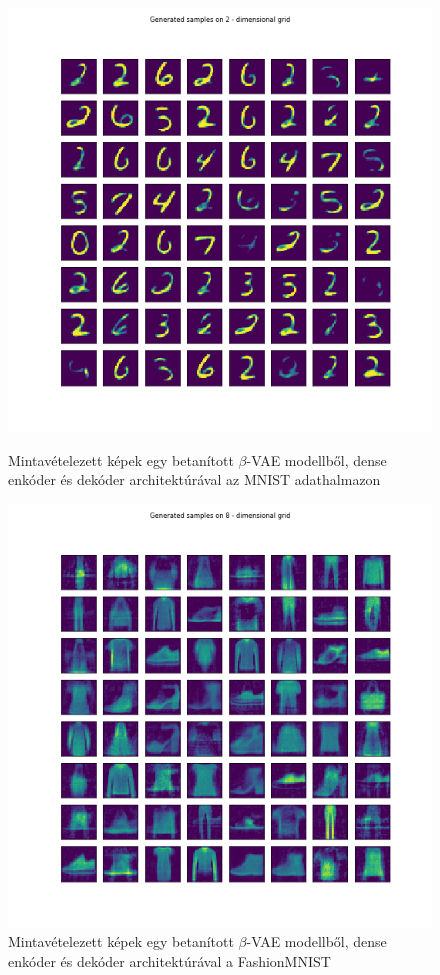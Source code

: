 \documentclass[12pt, english]{article}
\begin{document}
\begin{figure}[ht] 
  \begin{minipage}{0.48\linewidth}
    \centering
    \includegraphics[width=.65\linewidth]{gen/generated_samples_mnist_dense_vae.png}
    \caption{Mintavételezett képek egy betanított $\beta$-VAE modellből, dense enkóder és dekóder architektúrával az MNIST adathalmazon}
    \label{fig:sampled-images-1}
  \end{minipage}\hfill
  \begin{minipage}{0.48\linewidth}
    \centering
    \includegraphics[width=.65\linewidth]{gen/generated_samples_fashion_mnist_dense_vae.png} 
    \caption{Mintavételezett képek egy betanított $\beta$-VAE modellből, dense enkóder és dekóder architektúrával a FashionMNIST} 
    \label{fig:sampled-images-2}
  \end{minipage} 
\end{figure}
\end{document}
